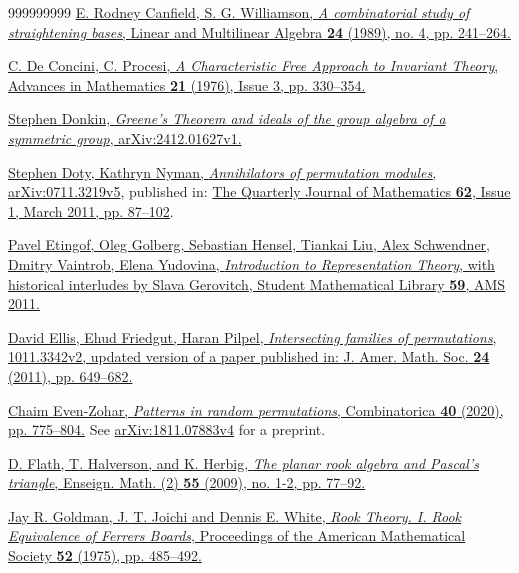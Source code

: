\documentclass[numbers=enddot,12pt,final,onecolumn,notitlepage]{scrartcl}%
\numberwithin{exer}{subsection}
\theoremstyle{definition}
\begin{document}
\begin{thebibliography}{999999999}
%
\href{https://doi.org/10.1080/03081088908817919}{E. Rodney Canfield, S. G.
Williamson, \textit{A combinatorial study of straightening bases}, Linear and
Multilinear Algebra \textbf{24} (1989), no. 4, pp. 241--264.}

%
\href{https://doi.org/10.1016/S0001-8708(76)80003-5}{C. De Concini, C.
Procesi, \textit{A Characteristic Free Approach to Invariant Theory}, Advances
in Mathematics \textbf{21} (1976), Issue 3, pp. 330--354.}

\href{https://arxiv.org/abs/2412.01627v1}{Stephen
Donkin, \textit{Greene's Theorem and ideals of the group algebra of a
symmetric group}, arXiv:2412.01627v1.}

\href{https://arxiv.org/abs/0711.3219v5}{Stephen
Doty, Kathryn Nyman, \textit{Annihilators of permutation modules},
arXiv:0711.3219v5}, published in:
\href{https://doi.org/10.1093/qmath/hap020}{The Quarterly Journal of
Mathematics \textbf{62}, Issue 1, March 2011, pp. 87--102}.

%
\href{https://math.mit.edu/~etingof/repb.pdf}{Pavel Etingof, Oleg Golberg,
Sebastian Hensel, Tiankai Liu, Alex Schwendner, Dmitry Vaintrob, Elena
Yudovina, \textit{Introduction to Representation Theory}, with historical
interludes by Slava Gerovitch, Student Mathematical Library \textbf{59}, AMS
2011.}

\href{https://arxiv.org/abs/1011.3342v2}{David
Ellis, Ehud Friedgut, Haran Pilpel, \textit{Intersecting families of
permutations}, 1011.3342v2, updated version of a paper published in: J. Amer.
Math. Soc. \textbf{24} (2011), pp. 649--682.}

%
\href{https://doi.org/10.1007/s00493-020-4212-z}{Chaim Even-Zohar,
\textit{Patterns in random permutations}, Combinatorica \textbf{40} (2020),
pp. 775--804.} See
\href{https://arxiv.org/abs/1811.07883v4}{arXiv:1811.07883v4} for a preprint.

%
\href{https://ems.press/content/serial-article-files/44173}{D. Flath, T.
Halverson, and K. Herbig, \textit{The planar rook algebra and Pascal's
triangle}, Enseign. Math. (2) \textbf{55} (2009), no. 1-2, pp. 77--92.}

%
\href{https://www.ams.org/journals/proc/1975-052-01/S0002-9939-1975-0429578-4/S0002-9939-1975-0429578-4.pdf}{Jay
R. Goldman, J. T. Joichi and Dennis E. White, \textit{Rook Theory. I. Rook
Equivalence of Ferrers Boards}, Proceedings of the American Mathematical
Society \textbf{52} (1975), pp. 485--492.}


\end{thebibliography}
\end{document}
